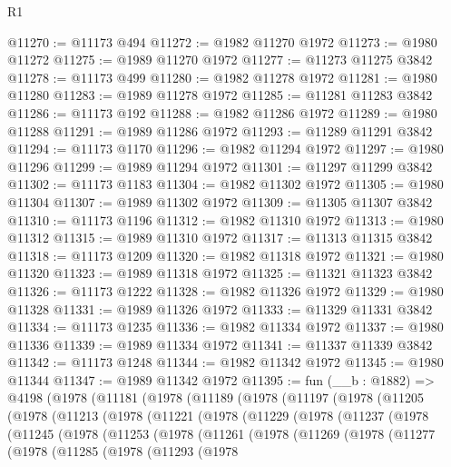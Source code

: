 \begin{lexlean}{R1}
\begin{coremodule}
@11270 := @11173 @494
@11272 := @1982 @11270 @1972
@11273 := @1980 @11272
@11275 := @1989 @11270 @1972
@11277 := @11273 @11275 @3842
@11278 := @11173 @499
@11280 := @1982 @11278 @1972
@11281 := @1980 @11280
@11283 := @1989 @11278 @1972
@11285 := @11281 @11283 @3842
@11286 := @11173 @192
@11288 := @1982 @11286 @1972
@11289 := @1980 @11288
@11291 := @1989 @11286 @1972
@11293 := @11289 @11291 @3842
@11294 := @11173 @1170
@11296 := @1982 @11294 @1972
@11297 := @1980 @11296
@11299 := @1989 @11294 @1972
@11301 := @11297 @11299 @3842
@11302 := @11173 @1183
@11304 := @1982 @11302 @1972
@11305 := @1980 @11304
@11307 := @1989 @11302 @1972
@11309 := @11305 @11307 @3842
@11310 := @11173 @1196
@11312 := @1982 @11310 @1972
@11313 := @1980 @11312
@11315 := @1989 @11310 @1972
@11317 := @11313 @11315 @3842
@11318 := @11173 @1209
@11320 := @1982 @11318 @1972
@11321 := @1980 @11320
@11323 := @1989 @11318 @1972
@11325 := @11321 @11323 @3842
@11326 := @11173 @1222
@11328 := @1982 @11326 @1972
@11329 := @1980 @11328
@11331 := @1989 @11326 @1972
@11333 := @11329 @11331 @3842
@11334 := @11173 @1235
@11336 := @1982 @11334 @1972
@11337 := @1980 @11336
@11339 := @1989 @11334 @1972
@11341 := @11337 @11339 @3842
@11342 := @11173 @1248
@11344 := @1982 @11342 @1972
@11345 := @1980 @11344
@11347 := @1989 @11342 @1972
@11395 := fun (__b : @1882) =>
  @4198
    (@1978
      (@11181
        (@1978
          (@11189
            (@1978
              (@11197
                (@1978
                  (@11205
                    (@1978
                      (@11213
                        (@1978
                          (@11221
                            (@1978
                              (@11229
                                (@1978
                                  (@11237
                                    (@1978
                                      (@11245
                                        (@1978
                                          (@11253
                                            (@1978
                                              (@11261
                                                (@1978
                                                  (@11269
                                                    (@1978
                                                      (@11277
                                                        (@1978
                                                          (@11285
                                                            (@1978
                                                              (@11293
                                                                (@1978

\end{coremodule}
\end{lexlean}
